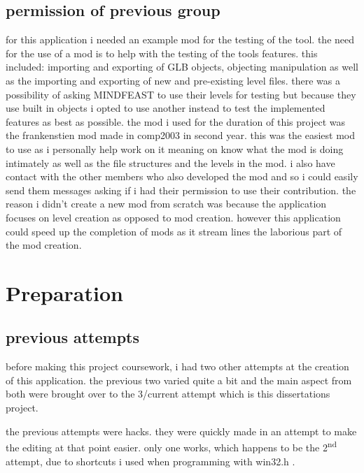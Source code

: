 \subsection{permission of previous group}
for this application i needed an example mod for the testing of the tool. the need for the use of a mod is to help with the testing of the tools features. this included: importing and exporting of GLB objects, objecting manipulation as well as the importing and exporting of new and pre-existing level files.
there was a possibility of asking MINDFEAST to use their levels for testing but because they use built in objects i opted to use another instead to test the implemented features as best as possible. 
the mod i used for the duration of this project was the frankenstien mod made in comp2003 in second year. this was the easiest mod to use as i personally help work on it meaning on know what the mod is doing intimately as well as the file structures and the levels in the mod. i also have contact with the other members  who also developed the mod and so i could easily send them messages asking if i had their permission to use their contribution. 
the reason i didn't create a new mod from scratch was because the application focuses on level creation as opposed to mod creation. however this application could speed up the completion of mods as it stream lines the laborious part of the mod creation.


\section{Preparation}
\subsection{previous attempts}
before making this project coursework, i had two other attempts at the creation of this application. the previous two varied quite a bit and the main aspect from both were brought over to the 3/current attempt which is this dissertations project.

the previous attempts were hacks. they were quickly made in an attempt to make the editing at that point easier. only one works, which happens to be the 2\textsuperscript{nd} attempt, due to shortcuts i used when programming with win32.h .
